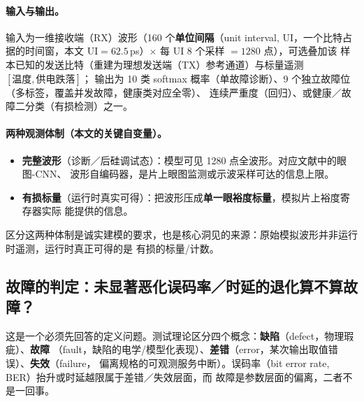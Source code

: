 \documentclass[11pt,a4paper,fontset=mac]{ctexart}
\newcommand{\term}[1]{\textbf{#1}}
\begin{document}
\paragraph{输入与输出。} 输入为一维接收端（RX）波形（160 个\term{单位间隔}（unit interval,
UI，一个比特占据的时间窗，本文 UI$=62.5$\,ps）$\times$ 每 UI 8 个采样 $=1280$ 点），可选叠加该
样本已知的发送比特（重建为理想发送端（TX）参考通道）与标量遥测 $[\text{温度},\text{供电跌落}]$；
输出为 10 类 softmax 概率（单故障诊断）、9 个独立故障位（多标签，覆盖并发故障，健康类对应全零）、
连续严重度（回归）、或健康／故障二分类（有损检测）之一。

\paragraph{两种观测体制（本文的关键自变量）。}
\begin{itemize}
\item \textbf{完整波形}（诊断／后硅调试态）：模型可见 1280 点全波形。对应文献中的眼图-CNN、
波形自编码器，是片上眼图监测或示波采样可达的信息上限。
\item \textbf{有损标量}（运行时真实可得）：把波形压成\textbf{单一眼裕度标量}，模拟片上裕度寄存器实际
能提供的信息。
\end{itemize}
区分这两种体制是诚实建模的要求，也是核心洞见的来源：原始模拟波形并非运行时遥测，运行时真正可得的是
有损的标量/计数。

\subsection{故障的判定：未显著恶化误码率／时延的退化算不算故障？}\label{sec:faultdef}
这是一个必须先回答的定义问题。测试理论区分四个概念：\term{缺陷}（defect，物理瑕疵）、\term{故障}
（fault，缺陷的电学/模型化表现）、\term{差错}（error，某次输出取值错误）、\term{失效}（failure，
偏离规格的可观测服务中断）。误码率（bit error rate, BER）抬升或时延越限属于差错／失效层面，而
故障是参数层面的偏离，二者不是一回事。
\end{document}
